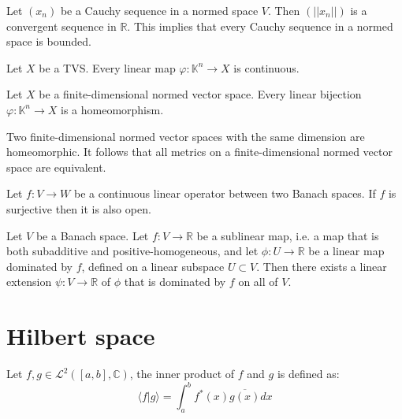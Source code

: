 	\begin{property}
		Let $(x_n)$ be a Cauchy sequence in a normed space $V$. Then $(||x_n||)$ is a convergent sequence in $\mathbb{R}$. This implies that every Cauchy sequence in a normed space is bounded.
	\end{property}

	\begin{property}
		Let $X$ be a TVS. Every linear map $\varphi:\mathbb{K}^n\rightarrow X$ is continuous.
	\end{property}
	\begin{property}
		Let $X$ be a finite-dimensional normed vector space. Every linear bijection $\varphi:\mathbb{K}^n\rightarrow X$ is a homeomorphism.
	\end{property}
	\begin{result}
		Two finite-dimensional normed vector spaces with the same dimension are homeomorphic. It follows that all metrics on a finite-dimensional normed vector space are equivalent.
	\end{result}

	\begin{theorem}
		Let $f:V\rightarrow W$ be a continuous linear operator between two Banach spaces. If $f$ is surjective then it is also open.
	\end{theorem}
	
	\begin{theorem}
		Let $V$ be a Banach space. Let $f:V\rightarrow\mathbb{R}$ be a sublinear map, i.e. a map that is both subadditive and positive-homogeneous, and let $\phi:U\rightarrow\mathbb{R}$ be a linear map dominated by $f$, defined on a linear subspace $U\subset V$. Then there exists a linear extension $\psi:V\rightarrow\mathbb{R}$ of $\phi$ that is dominated by $f$ on all of $V$.
	\end{theorem}

\section{Hilbert space}


	\begin{example}
		Let $f, g \in \mathcal{L}^2([a,b], \mathbb{C})$, the inner product of $f$ and $g$ is defined as:
		\begin{equation}
			\label{hilbert:inner_product}
		        \boxed{\langle f|g\rangle = \int_a^bf^*(x)\overline{g(x)}dx}
		\end{equation}
	\end{example}
    
